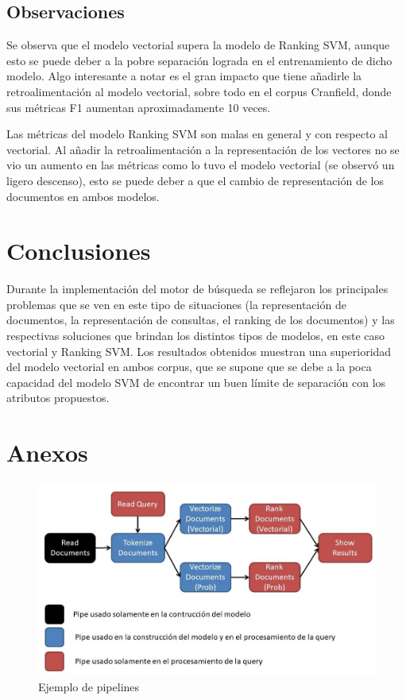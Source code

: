 \documentclass[runningheads]{llncs}
\begin{document}
\subsection{Observaciones}

Se observa que el modelo vectorial supera la modelo de Ranking SVM, aunque esto se puede deber a 
la pobre separación lograda en el entrenamiento de dicho modelo. Algo interesante a notar es el gran 
impacto que tiene añadirle la retroalimentación al modelo vectorial, sobre todo en el corpus Cranfield, 
donde sus métricas F1 aumentan aproximadamente 10 veces.

Las métricas del modelo Ranking SVM son malas en general y con respecto al vectorial. Al añadir la retroalimentación
a la representación de los vectores no se vio un aumento en las métricas como lo tuvo el modelo vectorial (se observó un
ligero descenso), esto se puede deber a que el cambio de representación de los documentos en ambos modelos.

\section{Conclusiones}

Durante la implementación del motor de búsqueda se reflejaron los principales problemas que se
ven en este tipo de situaciones (la representación de documentos, la representación de consultas, 
el ranking de los documentos) y las respectivas soluciones que brindan los distintos tipos de modelos,
en este caso vectorial y Ranking SVM. Los resultados obtenidos muestran una superioridad del modelo
vectorial en ambos corpus, que se supone que se debe a la poca capacidad del modelo SVM de encontrar
un buen límite de separación con los atributos propuestos. 

\newpage

\section{Anexos}

\begin{figure}
\includegraphics[width=\textwidth]{pipeline.jpg}
\caption{Ejemplo de pipelines} \label{pipeline_fig}
\end{figure}
\end{document}
